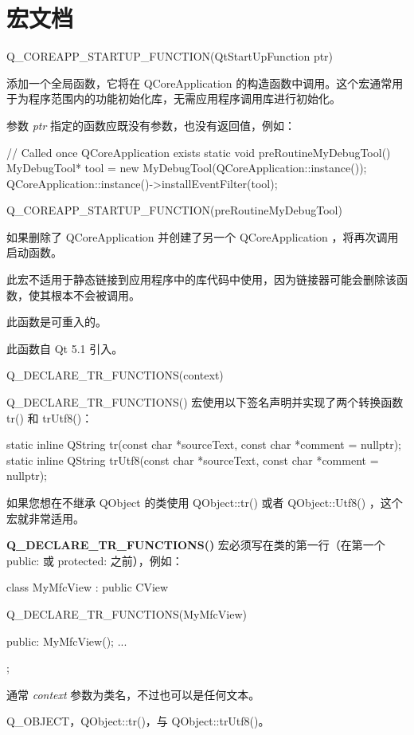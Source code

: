 \splitLine

\section{宏文档}

Q\_COREAPP\_STARTUP\_FUNCTION(QtStartUpFunction ptr)

添加一个全局函数，它将在 QCoreApplication 的构造函数中调用。这个宏通常用于为程序范围内的功能初始化库，无需应用程序调用库进行初始化。

参数 \emph{ptr} 指定的函数应既没有参数，也没有返回值，例如：


\begin{cppcode}
// Called once QCoreApplication exists
static void preRoutineMyDebugTool()
{
    MyDebugTool* tool = new MyDebugTool(QCoreApplication::instance());
    QCoreApplication::instance()->installEventFilter(tool);
}

Q_COREAPP_STARTUP_FUNCTION(preRoutineMyDebugTool)
\end{cppcode}



 

如果删除了 QCoreApplication 并创建了另一个 QCoreApplication ，将再次调用启动函数。

 
\begin{notice}
此宏不适用于静态链接到应用程序中的库代码中使用，因为链接器可能会删除该函数，使其根本不会被调用。
\end{notice}


\begin{notice}
 此函数是可重入的。
\end{notice}


此函数自 Qt 5.1 引入。

\splitLine

Q\_DECLARE\_TR\_FUNCTIONS(context)

Q\_DECLARE\_TR\_FUNCTIONS() 宏使用以下签名声明并实现了两个转换函数 tr() 和 trUtf8()：

\begin{cppcode}
static inline QString tr(const char *sourceText,
                         const char *comment = nullptr);
static inline QString trUtf8(const char *sourceText,
                             const char *comment = nullptr);
\end{cppcode}

如果您想在不继承 QObject 的类使用 QObject::tr() 或者 QObject::Utf8() ，这个宏就非常适用。

\textbf{Q\_DECLARE\_TR\_FUNCTIONS()} 宏必须写在类的第一行（在第一个 public: 或
protected: 之前），例如：

\begin{cppcode}
class MyMfcView : public CView
{
    Q_DECLARE_TR_FUNCTIONS(MyMfcView)

public:
    MyMfcView();
    ...
};
\end{cppcode}

通常 \emph{context} 参数为类名，不过也可以是任何文本。

\begin{seeAlso}
	Q\_OBJECT，QObject::tr()，与 QObject::trUtf8()。
\end{seeAlso}
